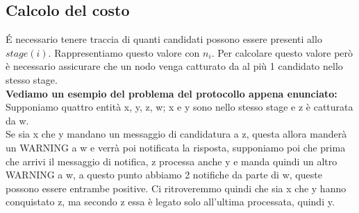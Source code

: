 \subsection{Calcolo del costo}
\'E necessario tenere traccia di quanti candidati possono essere presenti allo $stage(i)$. Rappresentiamo questo valore con $n_i$. Per calcolare questo valore però è necessario assicurare che un nodo venga catturato da al più 1 candidato nello stesso stage.\\
\textbf{Vediamo un esempio del problema del protocollo appena enunciato:}\\
Supponiamo quattro entità x, y, z, w; x e y sono nello stesso stage e z è catturata da w.\\
Se sia x che y mandano un messaggio di candidatura a z, questa allora manderà un WARNING a w e verrà poi notificata la risposta, supponiamo poi che prima che arrivi il messaggio di notifica, z processa anche y e manda quindi un altro WARNING a w, a questo punto abbiamo 2 notifiche da parte di w, queste possono essere entrambe positive. Ci ritroveremmo quindi che sia x che y hanno conquistato z, ma secondo z essa è legato solo all'ultima processata, quindi y.\\

